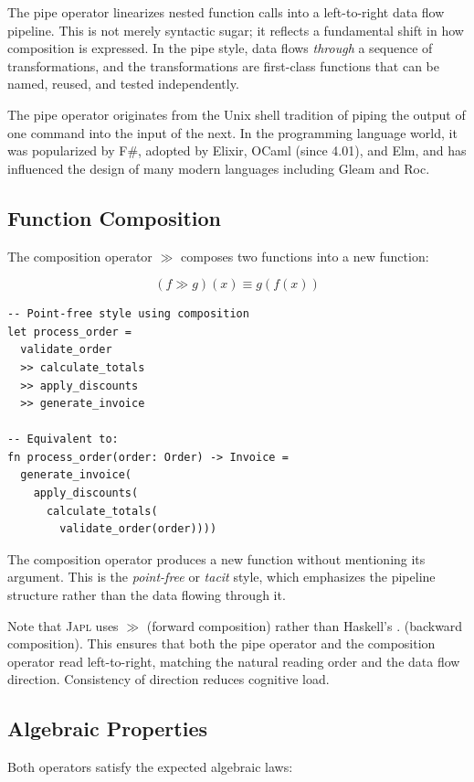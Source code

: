 \documentclass[11pt,a4paper]{article}
\newcommand{\japl}{\textsc{Japl}}
\begin{document}
The pipe operator linearizes nested function calls into a left-to-right data flow pipeline. This is not merely syntactic sugar; it reflects a fundamental shift in how composition is expressed. In the pipe style, data flows \emph{through} a sequence of transformations, and the transformations are first-class functions that can be named, reused, and tested independently.

The pipe operator originates from the Unix shell tradition of piping the output of one command into the input of the next. In the programming language world, it was popularized by F\#, adopted by Elixir, OCaml (since 4.01), and Elm, and has influenced the design of many modern languages including Gleam and Roc.

\subsection{Function Composition}

The composition operator $\gg$ composes two functions into a new function:

\[
(f \gg g)(x) \equiv g(f(x))
\]

\begin{lstlisting}
-- Point-free style using composition
let process_order =
  validate_order
  >> calculate_totals
  >> apply_discounts
  >> generate_invoice

-- Equivalent to:
fn process_order(order: Order) -> Invoice =
  generate_invoice(
    apply_discounts(
      calculate_totals(
        validate_order(order))))
\end{lstlisting}

The composition operator produces a new function without mentioning its argument. This is the \emph{point-free} or \emph{tacit} style, which emphasizes the pipeline structure rather than the data flowing through it.

Note that \japl{} uses $\gg$ (forward composition) rather than Haskell's $.$ (backward composition). This ensures that both the pipe operator and the composition operator read left-to-right, matching the natural reading order and the data flow direction. Consistency of direction reduces cognitive load.

\subsection{Algebraic Properties}

Both operators satisfy the expected algebraic laws:
\end{document}

